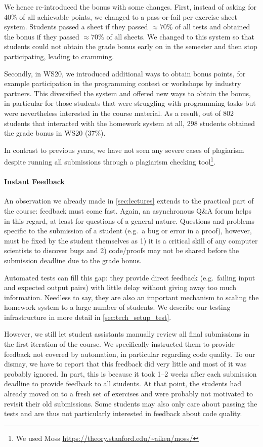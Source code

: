 We hence re-introduced the bonus with some changes.
First, instead of asking for $40\%$ of all achievable points,
we changed to a pass-or-fail per exercise sheet system.
Students passed a sheet if they
passed $\approx 70\%$ of all tests
and obtained the bonus if they passed $\approx 70\%$ of all sheets.
We changed to this system so that students
could not obtain the grade bonus early on in the semester and then stop participating,
leading to cramming.

Secondly, in WS20, we introduced additional ways to
obtain bonus points,
for example participation in the programming contest or workshops by industry partners.
This diversified the system and offered new ways
to obtain the bonus,
in particular for those students that were struggling
with programming tasks but were nevertheless interested in the course material.
As a result, out of 802 students that interacted with the homework system at all, 298 students obtained the grade bonus in WS20 ($37\%$).

In contrast to previous years,
we have not seen any severe cases of plagiarism despite
running all submissions through a plagiarism checking tool\footnote{We used Moss \url{https://theory.stanford.edu/~aiken/moss/}}.

\paragraph{Instant Feedback}
An observation we already made in \cref{sec:lectures}
extends to the practical part of the course:
feedback must come fast.
Again, an asynchronous Q\&A forum helps in this regard,
at least for questions of a general nature.
Questions and problems specific to the submission of a student (e.g.\ a bug or error in a proof),
however, must be fixed by the student themselves as 1) it is a critical skill of any computer scientists to discover bugs and 2) code/proofs may not be shared before the submission deadline due to the grade bonus.

Automated tests can fill this gap:
they provide direct feedback (e.g.\ failing input and expected output pairs) with little delay
without giving away too much information.
Needless to say, they are also an important mechanism
to scaling the homework system to a large number of students.
We describe our testing infrastructure in more detail in \cref{sec:tech_setup_test}.

However, we still let student assistants manually review all final submissions
in the first iteration of the course.
We specifically instructed them to provide feedback not covered by automation,
in particular regarding code quality.
To our dismay, we have to report that this feedback did very little and
most of it was probably ignored.
In part, this is because it took 1--2 weeks after each submission deadline to provide feedback to all students.
At that point, the students had already moved on to a fresh set of exercises and were probably not motivated to revisit their old submissions.
Some students may also only care about passing the tests
and are thus not particularly interested in feedback about code quality.


